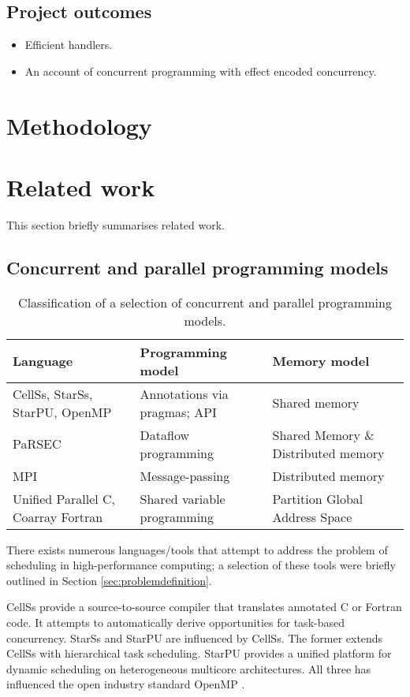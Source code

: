 \documentclass[preprint,10pt,numbers]{sigplanconf}
\begin{document}
\subsection{Project outcomes}
\begin{itemize}
  \item Efficient handlers.
  \item An account of concurrent programming with effect encoded concurrency.  
\end{itemize}

\section{Methodology}

  \section{Related work}\label{sec:relatedwork}
This section briefly summarises related work.

  \subsection{Concurrent and parallel programming models}
\begin{table*}
\centering
\begin{tabular}{| l | l | l |}
\hline
 \textbf{Language}             & \textbf{Programming model} & \textbf{Memory model}\\
\hline
CellSs, StarSs, StarPU, OpenMP & Annotations via pragmas; API & Shared memory \\
\hline
PaRSEC                         & Dataflow programming & Shared Memory \& Distributed memory  \\
\hline
MPI & Message-passing          & Distributed memory  \\
\hline
Unified Parallel C, Coarray Fortran & Shared variable programming & Partition Global Address Space \\
\hline
\end{tabular}
\caption{Classification of a selection of concurrent and parallel programming models.}\label{tbl:models}
\end{table*}
There exists numerous languages/tools that attempt to address the problem of scheduling in high-performance computing; a selection of these tools were briefly outlined in Section \ref{sec:problemdefinition}.

CellSs \cite{Bellens2009} provide a source-to-source compiler that translates annotated C or Fortran code. It attempts to automatically derive opportunities for task-based concurrency. StarSs \cite{Planas2009} and StarPU \cite{Augonnet2011} are influenced by CellSs. The former extends CellSs with hierarchical task scheduling. StarPU provides a unified platform for dynamic scheduling on heterogeneous multicore architectures. All three has influenced the open industry standard OpenMP \cite{Openmp2013}. 
\end{document}
